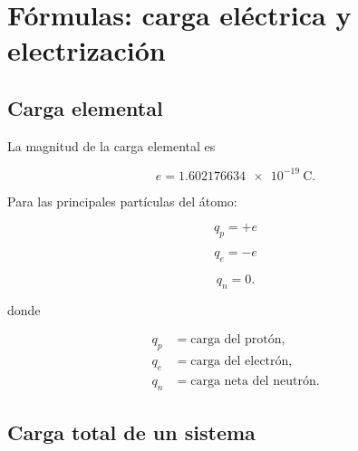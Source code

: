 
\section{Fórmulas: carga eléctrica y electrización}



\subsection{Carga elemental}

La magnitud de la carga elemental es

\begin{equation}
    \boxed{
    e=\SI{1.602176634e-19}{\coulomb}
    }.
\end{equation}

Para las principales partículas del átomo:

\begin{equation}
    \boxed{
    q_p=+e
    }
\end{equation}

\begin{equation}
    \boxed{
    q_e=-e
    }
\end{equation}

\begin{equation}
    \boxed{
    q_n=0
    }.
\end{equation}

donde

\begin{align*}
    q_p &= \text{carga del protón},\\
    q_e &= \text{carga del electrón},\\
    q_n &= \text{carga neta del neutrón}.
\end{align*}



\subsection{Carga total de un sistema}

